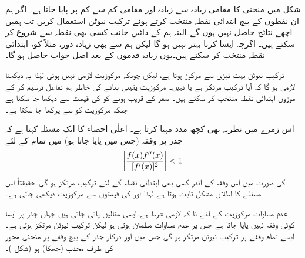 شکل  میں منحنی کا مقامی زیادہ سے زیادہ  اور مقامی کم سے کم  پر پایا جاتا ہے۔ اگر ہم ان نقطوں کے بیچ ابتدائی نقطہ منتخب کرتے ہوئے ترکیب نیوٹن استعمال کریں تب ہمیں اچھے نتائج حاصل نہیں ہوں گے۔البتہ ہم  کے دائیں جانب کسی بھی نقطہ سے شروع کر سکتے ہیں۔ اگرچہ ایسا کرنا بہتر نہیں ہو گا لیکن ہم  سے بھی زیادہ دور، مثلاً  کو، ابتدائی نقطہ منتخب کر سکتے ہیں۔یوں زیادہ قدموں کے بعد اصل جواب حاصل ہو گا۔

ترکیب نیوٹن بہت تیزی سے مرکوز ہوتا ہے، لیکن چونکہ مرکوزیت لازمی نہیں ہوتی لہٰذا یہ دیکھنا لازمی ہو گا کہ آیا ترکیب مرتکز ہے یا نہیں۔ مرکوزیت یقینی بنانے کی خاطر ہم تفاعل ترسیم کر کے موزوں ابتدائی نقطہ  منتخب کر سکتے ہیں۔ صفر کے قریب ہونے کو  کی قیمت سے دیکھا جا سکتا ہے جبکہ مرکوزیت کو  سے پرکھا جا سکتا ہے۔

اس زمرے میں نظریہ بھی کچھ مدد مہیا کرتا ہے۔ اعلٰی احصاء کا ایک مسئلہ کہتا ہے کہ جذر  پر وقفہ (جس میں  پایا جاتا ہو) میں تمام  کے لئے
\begin{align}\label{مساوات_استعمال_مرکوزیت_نیوٹن_الف}
\abs{\frac{f(x)f''(x)}{[f'(x)]^2}}<1
\end{align}
کی صورت میں اس وقفہ کے اندر کسی بھی ابتدائی نقطہ  کے لئے ترکیب مرتکز ہو گی۔حقیقتاً اس مسئلے کا اطلاق مشکل ثابت ہوتا ہے لہٰذا  اور  کی قیمتوں سے مرکوزیت دیکھی جاتی ہے۔

عدم مساوات  مرکوزیت کے لئے  نا کہ لازمی شرط ہے۔ایسی مثالیں پائی جاتی ہیں جہاں جذر  پر ایسا کوئی وقفہ نہیں پایا جاتا ہے جس پر عدم مساوات  مطمئن ہوتی ہو لیکن ترکیب نیوٹن مرتکز ہوتی ہے۔ ایسے تمام وقفے پر ترکیب نیوٹن مرتکز ہو گی جس میں  اور درکار جذر کے بیچ وقفے پر منحنی  محور  کی طرف محدب (جھکا) ہو (شکل )۔

